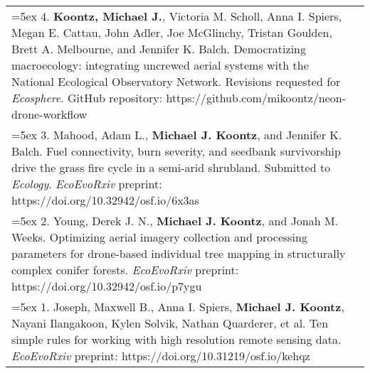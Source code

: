 \begin{longtable}{@{} >{\raggedright}p{6.25in} >{\raggedleft}X @{}}

\hangindent=5ex 4. \textbf{Koontz, Michael J.}, Victoria M. Scholl, Anna I. Spiers, Megan E. Cattau, John Adler, Joe McGlinchy, Tristan Goulden, Brett A. Melbourne, and Jennifer K. Balch. Democratizing macroecology: integrating uncrewed aerial systems with the National Ecological Observatory Network. Revisions requested for \emph{Ecosphere}. 
\newline GitHub repository: https://github.com/mikoontz/neon-drone-workflow & \tabularnewline

\hangindent=5ex 3. Mahood, Adam L., \textbf{Michael J. Koontz}, and Jennifer K. Balch. Fuel connectivity, burn severity, and seedbank survivorship drive the grass fire cycle in a semi-arid shrubland. Submitted to \emph{Ecology}. 
\newline \emph{EcoEvoRxiv} preprint: https://doi.org/10.32942/osf.io/6x3as & \tabularnewline

\hangindent=5ex 2. Young, Derek J. N., \textbf{Michael J. Koontz}, and Jonah M. Weeks. Optimizing aerial imagery collection and processing parameters for drone-based individual tree mapping in structurally complex conifer forests. 
\newline \emph{EcoEvoRxiv} preprint: https://doi.org/10.32942/osf.io/p7ygu & \tabularnewline

\hangindent=5ex 1. Joseph, Maxwell B., Anna I. Spiers, \textbf{Michael J. Koontz}, Nayani Ilangakoon, Kylen Solvik, Nathan Quarderer, et al. Ten simple rules for working with high resolution remote sensing data.
\newline \emph{EcoEvoRxiv} preprint: https://doi.org/10.31219/osf.io/kehqz & \tabularnewline


\end{longtable}
